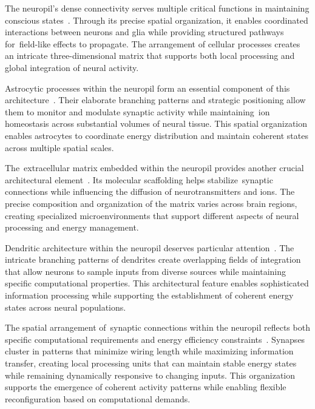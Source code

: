 The neuropil's dense connectivity serves multiple critical functions in maintaining conscious states~\cite{Kasthuri2015, Korogod2015}. Through its precise spatial organization, it enables coordinated interactions between neurons and glia while providing structured pathways for~field-like effects to propagate. The arrangement of cellular processes creates an intricate three-dimensional matrix that supports both local processing and global integration of neural activity.

Astrocytic processes within the neuropil form an essential component of this architecture~\cite{Peters1984, Verkhratsky2018}. Their elaborate branching patterns and strategic positioning allow them to monitor and modulate synaptic activity while maintaining~ion homeostasis across substantial volumes of neural tissue. This spatial organization enables astrocytes to coordinate energy distribution and maintain coherent states across multiple spatial scales.

The~extracellular matrix embedded within the neuropil provides another crucial architectural element~\cite{Braitenberg1998, Dityatev2010}. Its molecular scaffolding helps stabilize~synaptic connections while influencing the diffusion of neurotransmitters and ions. The precise composition and organization of the matrix varies across brain regions, creating specialized microenvironments that support different aspects of neural processing and energy management.

Dendritic architecture within the neuropil deserves particular attention~\cite{Rockland2020, London2005}. The intricate branching patterns of dendrites create overlapping fields of integration that allow neurons to sample inputs from diverse sources while maintaining specific computational properties. This architectural feature enables sophisticated information processing while supporting the establishment of coherent energy states across neural populations.

The spatial arrangement of~synaptic connections within the neuropil reflects both specific computational requirements and energy efficiency constraints~\cite{Markram2015, Beniaguev2021}. Synapses cluster in patterns that minimize wiring length while maximizing information transfer, creating local processing units that can maintain stable energy states while remaining dynamically responsive to changing inputs. This organization supports the emergence of coherent activity patterns while enabling flexible reconfiguration based on computational demands.

